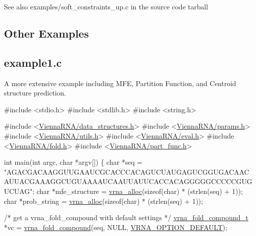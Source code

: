  \begin{DoxySeeAlso}{See also}
{\ttfamily examples/soft\+\_\+constraints\+\_\+up.\+c} in the source code tarball
\end{DoxySeeAlso}
\hypertarget{examples_c_ex_c_other}{}\subsection{Other Examples}\label{examples_c_ex_c_other}
\subsection*{example1.\+c }

A more extensive example including M\+FE, Partition Function, and Centroid structure prediction.


\begin{DoxyCodeInclude}
\textcolor{preprocessor}{#include <stdio.h>}
\textcolor{preprocessor}{#include <stdlib.h>}
\textcolor{preprocessor}{#include <string.h>}

\textcolor{preprocessor}{#include  <\mbox{\hyperlink{data__structures_8h}{ViennaRNA/data\_structures.h}}>}
\textcolor{preprocessor}{#include  <\mbox{\hyperlink{params_8h}{ViennaRNA/params.h}}>}
\textcolor{preprocessor}{#include  <\mbox{\hyperlink{utils_8h}{ViennaRNA/utils.h}}>}
\textcolor{preprocessor}{#include  <\mbox{\hyperlink{eval_8h}{ViennaRNA/eval.h}}>}
\textcolor{preprocessor}{#include  <\mbox{\hyperlink{fold_8h}{ViennaRNA/fold.h}}>}
\textcolor{preprocessor}{#include  <\mbox{\hyperlink{part__func_8h}{ViennaRNA/part\_func.h}}>}


\textcolor{keywordtype}{int}
main(\textcolor{keywordtype}{int}  argc,
     \textcolor{keywordtype}{char} *argv[])
\{
  \textcolor{keywordtype}{char}                  *seq =
    \textcolor{stringliteral}{"AGACGACAAGGUUGAAUCGCACCCACAGUCUAUGAGUCGGUGACAACAUUACGAAAGGCUGUAAAAUCAAUUAUUCACCACAGGGGGCCCCCGUGUCUAG"};
  \textcolor{keywordtype}{char}                  *mfe\_structure  = \mbox{\hyperlink{group__utils_gaf37a0979367c977edfb9da6614eebe99}{vrna\_alloc}}(\textcolor{keyword}{sizeof}(\textcolor{keywordtype}{char}) * (strlen(seq) + 1));
  \textcolor{keywordtype}{char}                  *prob\_string    = \mbox{\hyperlink{group__utils_gaf37a0979367c977edfb9da6614eebe99}{vrna\_alloc}}(\textcolor{keyword}{sizeof}(\textcolor{keywordtype}{char}) * (strlen(seq) + 1));

  \textcolor{comment}{/* get a vrna\_fold\_compound with default settings */}
  \mbox{\hyperlink{group__fold__compound_structvrna__fc__s}{vrna\_fold\_compound\_t}}  *vc = \mbox{\hyperlink{group__fold__compound_ga6601d994ba32b11511b36f68b08403be}{vrna\_fold\_compound}}(seq, NULL, 
      \mbox{\hyperlink{group__fold__compound_gacea5b7ee6181c485f36e2afa0e9089e4}{VRNA\_OPTION\_DEFAULT}});


\end{DoxyCodeInclude}

